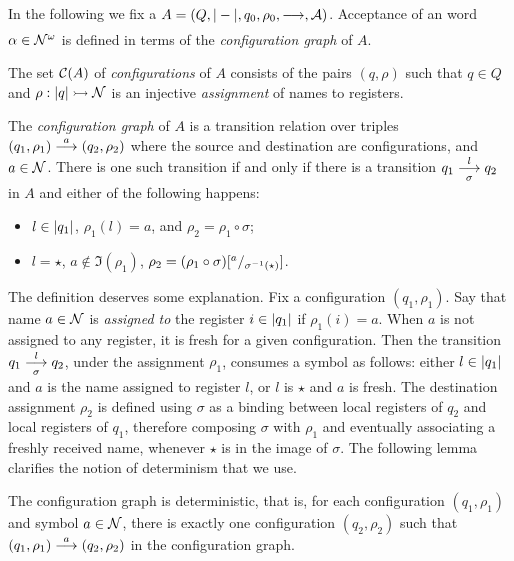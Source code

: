 In the following we fix a \hdma{} $A = (Q,|-|,q_0,\rho_0,\overset{}{\underset{}{\longrightarrow}},\mathcal{A})$. Acceptance of an word $\alpha \in \mathcal{N}^\omega$ is defined in terms of the \emph{configuration graph} of $A$.

\begin{definition}
 The set $\mathcal{C}(A)$ of \emph{configurations} of $A$ consists of the pairs $(q,\rho)$ such that $q \in Q$ and $\rho : |q| \rightarrowtail \mathcal{N}$ is an injective \emph{assignment} of names to registers.
\end{definition}

\begin{definition}
\label{def:config-graph}
 The \emph{configuration graph} of $A$ is a transition relation over triples $(q_1,\rho_1) \overset{a}{\longrightarrow} (q_2,\rho_2)$ where the source and destination are configurations, and $a \in \mathcal{N}$. There is one such transition if and only if there is a transition $q_1 \overset{l}{\underset{\sigma}{\longrightarrow}} q_2$ in $A$ and either of the following happens: 
 \begin{itemize} 
  \item $l \in |q_1|$, $\rho_1(l) = a$, and $\rho_2 = \rho_1 \circ \sigma$;
  \item $l = \star$, $a \notin \Im(\rho_1)$, $\rho_2 = (\rho_1 \circ \sigma)[{}^{a}/_{\sigma^{-1}(\star)}]$.
 \end{itemize}
\end{definition}
% 
The definition deserves some explanation. Fix a configuration $(q_1,\rho_1)$. Say that name $a\in \mathcal{N}$ is \emph{assigned to} the register $i \in |q_1|$ if $\rho_1(i) = a$. When $a$ is not assigned to any register, it is fresh for a given configuration. Then the transition $q_1 \overset{l}{\underset{\sigma}{\longrightarrow}} q_2$, under the assignment $\rho_1$, consumes a symbol as follows: either $l \in |q_1|$ and $a$ is the name assigned to register $l$, or $l$ is $\star$ and $a$ is fresh. The destination assignment $\rho_2$ is defined using $\sigma$ as a binding between local registers of $q_2$ and local registers of $q_1$, therefore composing $\sigma$ with $\rho_1$ and eventually associating a freshly received name, whenever $\star$ is in the image of $\sigma$. The following lemma clarifies the notion of determinism that we use.

\begin{lemma}\label{lem:deterministic-configuration-graph}
 The configuration graph is deterministic, that is, for each configuration $(q_1,\rho_1)$ and symbol $a \in \mathcal{N}$, there is exactly one configuration $(q_2,\rho_2)$ such that $(q_1,\rho_1) \overset{a}{\longrightarrow} (q_2,\rho_2)$ in the configuration graph.
\end{lemma}

